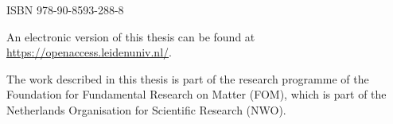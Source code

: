 \begin{titlepage}
\medskip
\noindent ISBN 978-90-8593-288-8

\medskip
\noindent An electronic version of this thesis can be found at \\
\url{https://openaccess.leidenuniv.nl/}.

\medskip

The work described in this thesis is part of the research programme of the
Foundation for Fundamental Research on Matter (FOM), which is part of the
Netherlands Organisation for Scientific Research (NWO). 

\end{titlepage}


